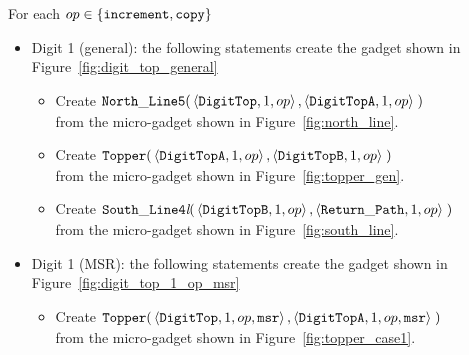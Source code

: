 For each $op \in \{ {\tt increment, copy } \}$
    \begin{itemize}

        \item Digit 1 (general): the following statements create the gadget shown in Figure~\ref{fig:digit_top_general}
        \begin{itemize}
            \item Create
            $\begin{aligned}[t]
                {\tt North\_Line5}(& \left \langle {\tt DigitTop},  1, op \right\rangle,
                                     \left \langle {\tt DigitTopA}, 1, op \right\rangle \;)
            \end{aligned}$\\from the micro-gadget shown in Figure~\ref{fig:north_line}.

            \item Create
            $\begin{aligned}[t]
                {\tt Topper}(& \left \langle {\tt DigitTopA}, 1, op \right\rangle,
                               \left \langle {\tt DigitTopB}, 1, op \right\rangle \;)
            \end{aligned}$\\from the micro-gadget shown in Figure~\ref{fig:topper_gen}.

            \item Create
            $\begin{aligned}[t]
                {\tt South\_Line4\textit{l}}(& \left\langle {\tt DigitTopB}, 1, op \right\rangle,
                                               \left\langle {\tt Return\_Path},     1, op \right\rangle \;)
            \end{aligned}$\\from the micro-gadget shown in Figure~\ref{fig:south_line}.
        \end{itemize}
        \vspace{1cm}

        \item Digit 1 (MSR): the following statements create the gadget shown in Figure~\ref{fig:digit_top_1_op_msr}
        \begin{itemize}
            \item Create
            $\begin{aligned}[t]
                {\tt Topper}(& \left\langle {\tt DigitTop},  1, op, {\tt msr} \right\rangle,
                               \left\langle {\tt DigitTopA}, 1, op, {\tt msr} \right\rangle \;)
            \end{aligned}$ \\ from the micro-gadget shown in Figure~\ref{fig:topper_case1}.



\end{itemize}
\end{itemize}
